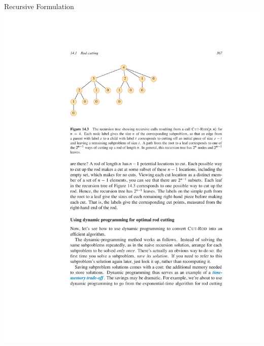 \documentclass{beamer}
\begin{document}
\begin{frame}{Recursive Formulation}
    \centering
    \includegraphics[width=\textwidth,clip=true,trim=5cm 19cm 8cm 4cm]{figures/p367}
\end{frame}
\end{document}
